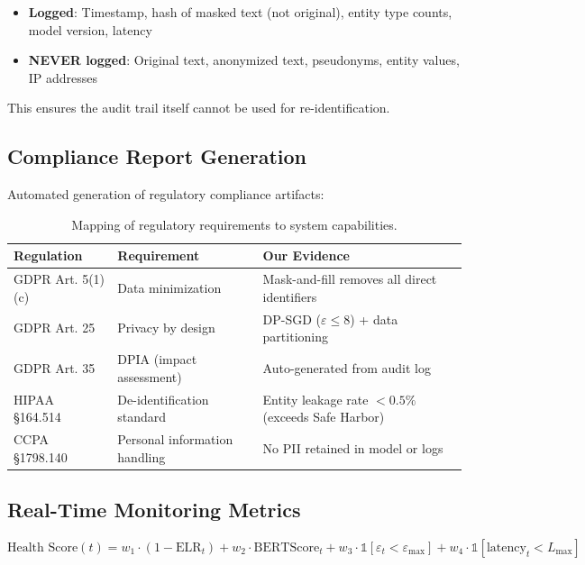 \documentclass[11pt, a4paper]{article}
\newcommand{\eps}{\varepsilon}
\begin{document}
\begin{keyresult}
\begin{itemize}[nosep]
  \item \textbf{Logged}: Timestamp, hash of masked text (not original), entity type counts, model version, latency
  \item \textbf{NEVER logged}: Original text, anonymized text, pseudonyms, entity values, IP addresses
\end{itemize}
This ensures the audit trail itself cannot be used for re-identification.
\end{keyresult}

\subsection{Compliance Report Generation}

Automated generation of regulatory compliance artifacts:

\begin{table}[H]
\centering
\small
\begin{tabular}{lll}
\toprule
\textbf{Regulation} & \textbf{Requirement} & \textbf{Our Evidence} \\
\midrule
GDPR Art. 5(1)(c) & Data minimization & Mask-and-fill removes all direct identifiers \\
GDPR Art. 25 & Privacy by design & DP-SGD ($\eps \leq 8$) + data partitioning \\
GDPR Art. 35 & DPIA (impact assessment) & Auto-generated from audit log \\
HIPAA \S 164.514 & De-identification standard & Entity leakage rate $< 0.5\%$ (exceeds Safe Harbor) \\
CCPA \S 1798.140 & Personal information handling & No PII retained in model or logs \\
\bottomrule
\end{tabular}
\caption{Mapping of regulatory requirements to system capabilities.}
\end{table}

\subsection{Real-Time Monitoring Metrics}

\begin{equation}
\text{Health Score}(t) = w_1 \cdot (1 - \text{ELR}_t) + w_2 \cdot \text{BERTScore}_t + w_3 \cdot \mathbb{1}[\eps_t < \eps_{\max}] + w_4 \cdot \mathbb{1}[\text{latency}_t < L_{\max}]
\end{equation}
\end{document}
